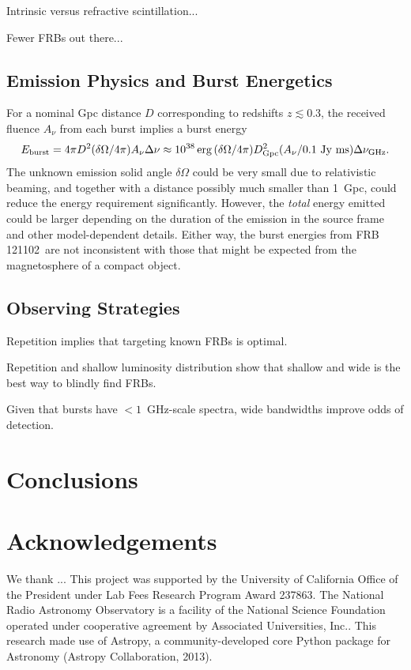 \documentclass{emulateapj}
\newcommand{\frb}{FRB 121102}
\begin{document}
Intrinsic versus refractive scintillation...

Fewer FRBs out there...

\subsection{Emission Physics and Burst Energetics}

For a nominal Gpc distance $D$ corresponding to redshifts $z\lesssim 0.3$, the received fluence $A_{\nu}$ from each burst implies  a burst energy
$$E_{\rm burst} = 4\pi D^2 (\delta\Omega/4\pi) A_{\nu} \Delta\nu
\approx 10^{38}\, {\rm erg}\,(\delta\Omega/4\pi) D_{\rm Gpc}^2  (A_{\nu} / 0.1\ {\rm Jy\ ms}) \Delta\nu_{\rm GHz}.$$
The unknown  emission solid angle $\delta\Omega$
could be very small due to relativistic beaming, and together with a distance possibly much smaller than 1~Gpc, could reduce the energy requirement significantly.  However, the {\it total} energy emitted could be larger depending on the duration of the emission in the source frame and other model-dependent details.
Either way, the burst energies from \frb\ are not inconsistent with those that might be expected from the magnetosphere of a compact object\cite{cw16}.



\subsection{Observing Strategies}

Repetition implies that targeting known FRBs is optimal.

Repetition and shallow luminosity distribution show that shallow and wide is the best way to blindly find FRBs.

Given that bursts have $<1$~GHz-scale spectra, wide bandwidths improve odds of detection.

\section{Conclusions}





\section*{Acknowledgements}
We thank ...
This project was supported by the University of California Office of the President under Lab Fees Research Program Award 237863. The National Radio Astronomy Observatory is a facility of the National Science Foundation operated under cooperative agreement by Associated Universities, Inc.. This research made use of Astropy, a community-developed core Python package for Astronomy (Astropy Collaboration, 2013).
\end{document}
